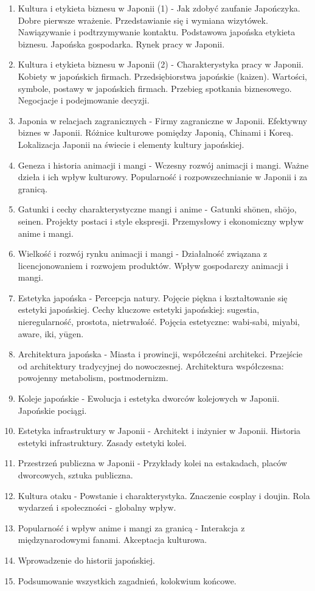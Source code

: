 \documentclass[12pt, a4paper]{article}
\begin{document}
\begin{enumerate}
  \item Kultura i etykieta biznesu w Japonii (1) - Jak zdobyć zaufanie Japończyka. Dobre pierwsze wrażenie. Przedstawianie się i wymiana wizytówek. Nawiązywanie i podtrzymywanie kontaktu. Podstawowa japońska etykieta biznesu. Japońska gospodarka. Rynek pracy w Japonii.
  \item Kultura i etykieta biznesu w Japonii (2) - Charakterystyka pracy w Japonii. Kobiety w japońskich firmach. Przedsiębiorstwa japońskie (kaizen). Wartości, symbole, postawy w japońskich firmach. Przebieg spotkania biznesowego. Negocjacje i podejmowanie decyzji.
  \item Japonia w relacjach zagranicznych - Firmy zagraniczne w Japonii. Efektywny biznes w Japonii. Różnice kulturowe pomiędzy Japonią, Chinami i Koreą. Lokalizacja Japonii na świecie i elementy kultury japońskiej.
  \item Geneza i historia animacji i mangi - Wczesny rozwój animacji i mangi. Ważne dzieła i ich wpływ kulturowy. Popularność i rozpowszechnianie w Japonii i za granicą.
  \item Gatunki i cechy charakterystyczne mangi i anime - Gatunki shōnen, shōjo, seinen. Projekty postaci i style ekspresji. Przemysłowy i ekonomiczny wpływ anime i mangi.
  \item Wielkość i rozwój rynku animacji i mangi - Działalność związana z licencjonowaniem i rozwojem produktów. Wpływ gospodarczy animacji i mangi.
  \item Estetyka japońska - Percepcja natury. Pojęcie piękna i kształtowanie się estetyki japońskiej. Cechy kluczowe estetyki japońskiej: sugestia, nieregularność, prostota, nietrwałość. Pojęcia estetyczne: wabi-sabi, miyabi, aware, iki, yūgen.
  \item Architektura japońska - Miasta i prowincji, współcześni architekci. Przejście od architektury tradycyjnej do nowoczesnej. Architektura współczesna: powojenny metabolism, postmodernizm.
  \item Koleje japońskie - Ewolucja i estetyka dworców kolejowych w Japonii. Japońskie pociągi.
  \item Estetyka infrastruktury w Japonii - Architekt i inżynier w Japonii. Historia estetyki infrastruktury. Zasady estetyki kolei.
  \item Przestrzeń publiczna w Japonii - Przykłady kolei na estakadach, placów dworcowych, sztuka publiczna.
  \item Kultura otaku - Powstanie i charakterystyka. Znaczenie cosplay i doujin. Rola wydarzeń i społeczności - globalny wpływ.
  \item Popularność i wpływ anime i mangi za granicą - Interakcja z międzynarodowymi fanami. Akceptacja kulturowa.
  \item Wprowadzenie do historii japońskiej.
  \item Podsumowanie wszystkich zagadnień, kolokwium końcowe.
\end{enumerate}
\end{document}
